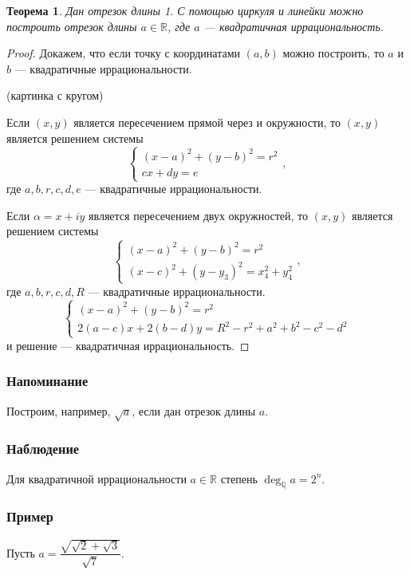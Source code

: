 \documentclass[a4paper]{article}
\newcommand{\R}{\ensuremath{\mathbb{R}}}
\newcommand{\Q}{\ensuremath{\mathbb{Q}}}
\newtheorem{theorem}{Теорема}
\numberwithin{theorem}{section}
\numberwithin{lemma}{section}
\numberwithin{proposition}{section}
\numberwithin{corollary}{section}
\begin{document}
\begin{theorem}
Дан отрезок длины 1. С помощью циркуля и линейки можно построить отрезок длины $a \in \R$, где $a$ --- квадратичная иррациональность.
\end{theorem}
\begin{proof}
Докажем, что если точку с координатами $(a, b)$ можно построить,
то $a$ и $b$ --- квадратичные иррациональности.

(картинка с кругом)

Если $(x, y)$ является пересечением прямой через и окружности,
то $(x, y)$ является решением системы
\[
    \begin{cases}
        (x - a)^2 + (y - b)^2 = r^2 \\
        cx+dy = e
    \end{cases},
\]
где $a, b, r, c,d,e$ --- квадратичные иррациональности.

Если $\alpha = x + iy$ является пересечением двух окружностей,
то $(x, y)$ является решением системы
\[
    \begin{cases}
        (x - a)^2 + (y - b)^2 = r^2 \\
        (x - c)^2 + (y - y_3)^2 = x_4^2 + y_4^2
    \end{cases},
\]
где $a, b, r, c,d, R$ --- квадратичные иррациональности.
\[
    \begin{cases}
        (x - a)^2 + (y - b)^2 = r^2 \\
        2(a - c)x + 2(b - d)y = R^2 - r^2 + a^2 + b^2 -c^2-d^2
    \end{cases}
\]
и решение --- квадратичная иррациональность.
\end{proof}

\subsubsection*{Напоминание}
Построим, например, $\sqrt{a}$, если дан отрезок длины $a$.

\subsubsection*{Наблюдение}
Для квадратичной иррациональности $a \in \R$
степень $\deg_\Q a = 2^n$.

\subsubsection*{Пример}
Пусть $a = \dfrac{\sqrt{\sqrt{2}+\sqrt{3}}}{\sqrt{7}}$.
\end{document}
